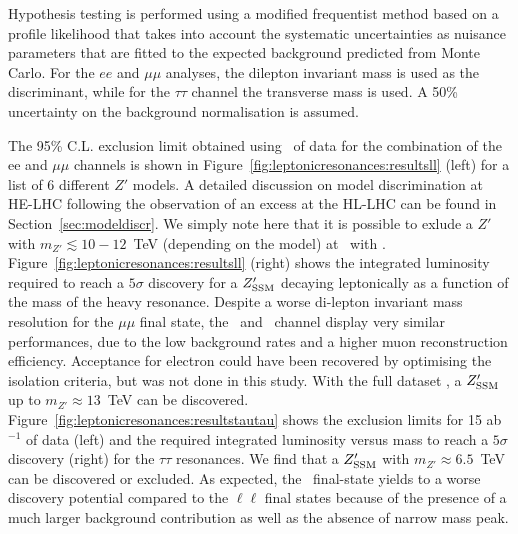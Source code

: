 Hypothesis testing is performed using a modified frequentist method based on a profile likelihood that takes into account the systematic uncertainties as nuisance parameters that are fitted to the expected background predicted from Monte Carlo. For the $ee$ and $\mu\mu$ analyses, the dilepton invariant mass is used as the discriminant, while for the $\tau\tau$ channel the transverse mass is used. A 50\% uncertainty on the background normalisation is assumed.

The 95\% C.L. exclusion limit obtained using \intlumihelhc\ of data for the combination of the ee and $\mu\mu$ channels is shown in Figure~\ref{fig:leptonicresonances:resultsll} (left) for a list of 6 different $Z'$ models. A detailed discussion on model discrimination at HE-LHC following the observation of an excess at the HL-LHC can be found in Section~\ref{sec:modeldiscr}. We simply note here that it is possible to exlude a $Z'$ with $m_{Z'}\lesssim 10-12$~TeV (depending on the model) at \sqrtshelhc\ with \intlumihelhc. Figure~\ref{fig:leptonicresonances:resultsll} (right) shows the integrated luminosity required to reach a $5\sigma$ discovery for a $Z^{\prime}_{\mathrm{SSM}}$ decaying leptonically as a function of the mass of the heavy resonance. Despite a worse di-lepton invariant mass resolution for the $\mu\mu$ final state, the \Zpee\ and \Zpmumu\ channel display very similar performances, due to the low background rates and a higher muon reconstruction efficiency. Acceptance for electron could have been recovered by optimising the isolation criteria, but was not done in this study. With the full dataset \intlumihelhc, a $Z^{\prime}_{\mathrm{SSM}}$ up to $m_{Z'}\approx 13$~TeV can be discovered.  Figure~\ref{fig:leptonicresonances:resultstautau} shows the exclusion limits for 15 ab$^{-1}$ of data (left) and the required integrated luminosity
versus mass to reach a $5\sigma$ discovery (right) for the $\tau\tau$ resonances. We find that a $Z^{\prime}_{\mathrm{SSM}}$ with $m_{Z'}\approx 6.5$~TeV can be discovered or excluded. As expected, the \Zptata\ final-state yields to a worse discovery potential compared to the $\ell\ell$ final states because of the presence of a much larger background contribution as well as the absence of narrow mass peak.

